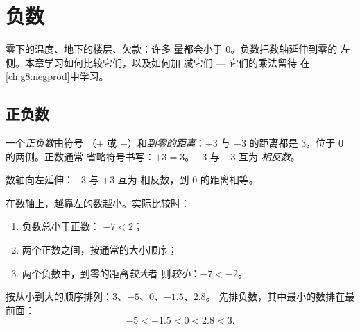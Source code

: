 \chapter{负数}\label{ch:g7:negatives}

零下的温度、地下的楼层、欠款：许多
量都会小于 $0$。负数把数轴延伸到零的
左侧。本章学习如何比较它们，以及如何加
减它们 --- 它们的乘法留待
在\cref{ch:g8:negprod}中学习。

\section{正负数}

\begin{definition}[正负数]\label{def:g7:negatives:def}
一个\emph{正负数}由符号
（$+$ 或 $-$）和\emph{到零的距离}：$+3$ 与 $-3$
的距离都是 $3$，位于 $0$ 的两侧。正数通常
省略符号书写：$+3 = 3$。$+3$ 与 $-3$ 互为
\emph{相反数}。
\end{definition}

\begin{omfigure}

{\small 数轴向左延伸：$-3$ 与 $+3$ 互为
相反数，到 $0$ 的距离相等。}
\end{omfigure}

\begin{method}[比较正负数]\label{met:g7:negatives:compare}
在数轴上，越靠左的数越小。实际比较时：
\begin{enumerate}
  \item 负数总小于正数：
        $-7 < 2$；
  \item 两个正数之间，按通常的大小顺序；
  \item 两个负数中，到零的距离\emph{较大}者
        则\emph{较小}：$-7 < -2$。
\end{enumerate}
\end{method}

\begin{example}\label{ex:g7:negatives:compare}
按从小到大的顺序排列：$3$、$-5$、$0$、$-1.5$、$2.8$。
先排负数，其中最小的数排在最前面：
\[
-5 < -1.5 < 0 < 2.8 < 3 .
\]
\end{example}


